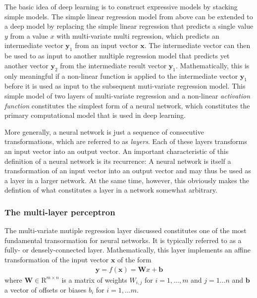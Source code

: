 \begin{description}
  The basic idea of deep learning is to construct expressive models by stacking
  simple models. The simple linear regression model from above can be extended
  to a deep model by replacing the simple linear regression that predicts a
  single value $y$ from a value $x$ with multi-variate multi regression, which
  predicts an intermediate vector $\mathbf{y}_1$ from an input vector
  $\mathbf{x}$. The intermediate vector can then be used to as input to another
  multiple regression model that predicts yet another vector $\mathbf{y}_2$ from
  the intermediate result vector $\mathbf{y}_1$. Mathematically, this is only
  meaningful if a non-linear function is applied to the intermediate vector
  $\mathbf{y}_1$ before it is used as input to the subsequent muti-variate
  regression model. This simple model of two layers of multi-variate regression
  and a non-linear \textit{activation function} constitutes the simplest form of
  a neural network, which constitutes the primary computational model that is
  used in deep learning.

  More generally, a neural network is just a sequence of consecutive
  transformations, which are referred to as \textit{layers}. Each of these
  layers transforms an input vector into an output vector. An important
  characteristic of this definition of a neural network is its recurrence: A
  neural network is itself a transformation of an input vector into an output
  vector and may thus be used as a layer in a larger network. At the same time,
  however, this obviously makes the defintion of what constitutes a layer in a
  network somewhat arbitrary.


  \subsubsection{The multi-layer perceptron}

  The multi-variate mutiple regression layer discussed constitutes one of the
  most fundamental transormation for neural networks. It is typically referred
  to as a fully- or densely-connected layer. Mathematically, this layer
  implements an affine transformation of the input vector $\bm{x}$ of the form
  \begin{align}
    \bm{y} = f(\bm{x}) = \bm{W}x + \bm{b}
  \end{align}
  where $\bm{W} \in \mathrm{R}^{m \times n}$ is a matrix of weights $W_{i,j}$
  for $i = 1, \ldots, m$ and $j = 1 \ldots n$ and $\bm{b}$ a vector of offsets
  or biases $b_i$ for $i = 1, \ldots m$.


\end{description}
